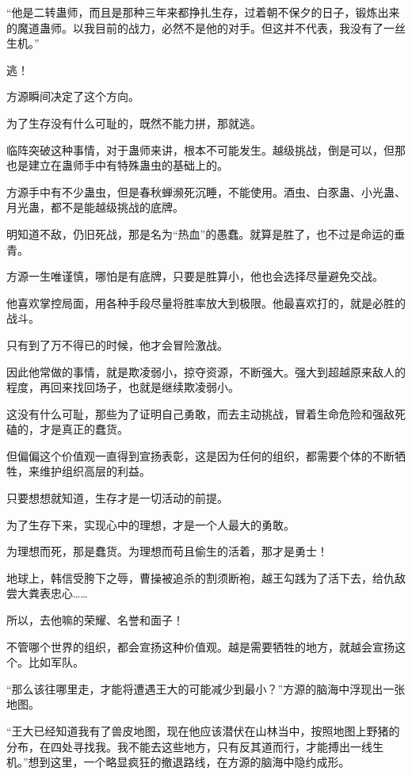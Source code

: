 \begin{this_body}
“他是二转蛊师，而且是那种三年来都挣扎生存，过着朝不保夕的日子，锻炼出来的魔道蛊师。以我目前的战力，必然不是他的对手。但这并不代表，我没有了一丝生机。”

逃！

方源瞬间决定了这个方向。

为了生存没有什么可耻的，既然不能力拼，那就逃。

临阵突破这种事情，对于蛊师来讲，根本不可能发生。越级挑战，倒是可以，但那也是建立在蛊师手中有特殊蛊虫的基础上的。

方源手中有不少蛊虫，但是春秋蝉濒死沉睡，不能使用。酒虫、白豕蛊、小光蛊、月光蛊，都不是能越级挑战的底牌。

明知道不敌，仍旧死战，那是名为“热血”的愚蠢。就算是胜了，也不过是命运的垂青。

方源一生唯谨慎，哪怕是有底牌，只要是胜算小，他也会选择尽量避免交战。

他喜欢掌控局面，用各种手段尽量将胜率放大到极限。他最喜欢打的，就是必胜的战斗。

只有到了万不得已的时候，他才会冒险激战。

因此他常做的事情，就是欺凌弱小，掠夺资源，不断强大。强大到超越原来敌人的程度，再回来找回场子，也就是继续欺凌弱小。

这没有什么可耻，那些为了证明自己勇敢，而去主动挑战，冒着生命危险和强敌死磕的，才是真正的蠢货。

但偏偏这个价值观一直得到宣扬表彰，这是因为任何的组织，都需要个体的不断牺牲，来维护组织高层的利益。

只要想想就知道，生存才是一切活动的前提。

为了生存下来，实现心中的理想，才是一个人最大的勇敢。

为理想而死，那是蠢货。为理想而苟且偷生的活着，那才是勇士！

地球上，韩信受胯下之辱，曹操被追杀的割须断袍，越王勾践为了活下去，给仇敌尝大粪表忠心……

所以，去他嘛的荣耀、名誉和面子！

不管哪个世界的组织，都会宣扬这种价值观。越是需要牺牲的地方，就越会宣扬这个。比如军队。

“那么该往哪里走，才能将遭遇王大的可能减少到最小？”方源的脑海中浮现出一张地图。

“王大已经知道我有了兽皮地图，现在他应该潜伏在山林当中，按照地图上野猪的分布，在四处寻找我。我不能去这些地方，只有反其道而行，才能搏出一线生机。”想到这里，一个略显疯狂的撤退路线，在方源的脑海中隐约成形。


\end{this_body}

